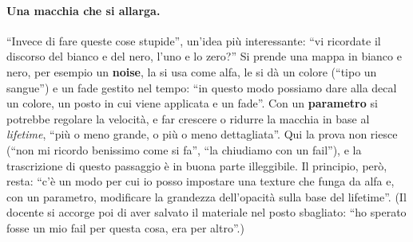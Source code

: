 \paragraph{Una macchia che si allarga.} ``Invece di fare queste cose stupide'', un'idea più
interessante: ``vi ricordate il discorso del bianco e del nero, l'uno e lo zero?'' Si prende una
mappa in bianco e nero, per esempio un \textbf{noise}, la si usa come alfa, le si dà un colore
(``tipo un sangue'') e un fade gestito nel tempo: ``in questo modo possiamo dare alla decal un
colore, un posto in cui viene applicata e un fade''. Con un \textbf{parametro} si potrebbe
regolare la velocità, e far crescere o ridurre la macchia in base al \emph{lifetime}, ``più o
meno grande, o più o meno dettagliata''. Qui la prova non riesce (``non mi ricordo benissimo come
si fa'', ``la chiudiamo con un fail''), e la trascrizione di questo passaggio è in buona parte
illeggibile. Il principio, però, resta: ``c'è un modo per cui io posso impostare una texture che
funga da alfa e, con un parametro, modificare la grandezza dell'opacità sulla base del lifetime''.
(Il docente si accorge poi di aver salvato il materiale nel posto sbagliato: ``ho sperato fosse
un mio fail per questa cosa, era per altro''.)

